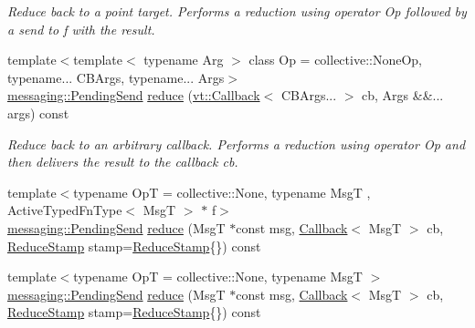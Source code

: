 \begin{DoxyCompactItemize}
\begin{DoxyCompactList}\small\item\em Reduce back to a point target. Performs a reduction using operator {\ttfamily Op} followed by a send to {\ttfamily f} with the result. \end{DoxyCompactList}\item 
{\footnotesize template$<$template$<$ typename Arg $>$ class Op = collective\+::\+None\+Op, typename... C\+B\+Args, typename... Args$>$ }\\\hyperlink{structvt_1_1messaging_1_1_pending_send}{messaging\+::\+Pending\+Send} \hyperlink{structvt_1_1vrt_1_1collection_1_1_reducable_a9e1ce747f05b89cddb6d7306e2339fc1}{reduce} (\hyperlink{namespacevt_a57b238783d05de96bc2c4027f7073b7f}{vt\+::\+Callback}$<$ C\+B\+Args... $>$ cb, Args \&\&... args) const
\begin{DoxyCompactList}\small\item\em Reduce back to an arbitrary callback. Performs a reduction using operator {\ttfamily Op} and then delivers the result to the callback {\ttfamily cb}. \end{DoxyCompactList}\item 
{\footnotesize template$<$typename OpT  = collective\+::\+None, typename MsgT , Active\+Typed\+Fn\+Type$<$ Msg\+T $>$ $\ast$ f$>$ }\\\hyperlink{structvt_1_1messaging_1_1_pending_send}{messaging\+::\+Pending\+Send} \hyperlink{structvt_1_1vrt_1_1collection_1_1_reducable_a6498376c8ae3532a626bc78005a0b3e3}{reduce} (MsgT $\ast$const msg, \hyperlink{namespacevt_a57b238783d05de96bc2c4027f7073b7f}{Callback}$<$ MsgT $>$ cb, \hyperlink{structvt_1_1vrt_1_1collection_1_1_reducable_a19f80baf23f36dad4948ef07322fd0cb}{Reduce\+Stamp} stamp=\hyperlink{structvt_1_1vrt_1_1collection_1_1_reducable_a19f80baf23f36dad4948ef07322fd0cb}{Reduce\+Stamp}\{\}) const
\item 
{\footnotesize template$<$typename OpT  = collective\+::\+None, typename MsgT $>$ }\\\hyperlink{structvt_1_1messaging_1_1_pending_send}{messaging\+::\+Pending\+Send} \hyperlink{structvt_1_1vrt_1_1collection_1_1_reducable_a07fa6b35352b3c6ae05a210248601020}{reduce} (MsgT $\ast$const msg, \hyperlink{namespacevt_a57b238783d05de96bc2c4027f7073b7f}{Callback}$<$ MsgT $>$ cb, \hyperlink{structvt_1_1vrt_1_1collection_1_1_reducable_a19f80baf23f36dad4948ef07322fd0cb}{Reduce\+Stamp} stamp=\hyperlink{structvt_1_1vrt_1_1collection_1_1_reducable_a19f80baf23f36dad4948ef07322fd0cb}{Reduce\+Stamp}\{\}) const
\item 

\end{DoxyCompactItemize}
